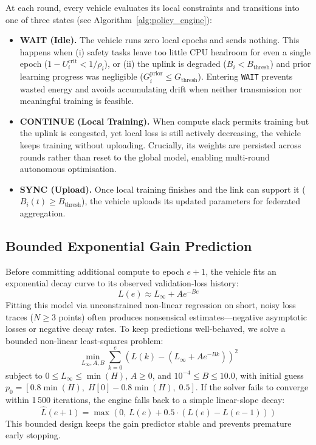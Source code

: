 \documentclass[conference]{IEEEtran}
\begin{document}
At each round, every vehicle evaluates its local constraints and transitions into one of three states (see Algorithm~\ref{alg:policy_engine}):

\begin{itemize}
    \item \textbf{WAIT (Idle).} The vehicle runs zero local epochs and sends nothing. This happens when (i) safety tasks leave too little CPU headroom for even a single epoch ($1 - U_i^{\text{crit}} < 1/\rho_i$), or (ii) the uplink is degraded ($B_i < B_{\text{thresh}}$) and prior learning progress was negligible ($G_i^{\text{prior}} \le G_{\text{thresh}}$). Entering \texttt{WAIT} prevents wasted energy and avoids accumulating drift when neither transmission nor meaningful training is feasible.
    \item \textbf{CONTINUE (Local Training).} When compute slack permits training but the uplink is congested, yet local loss is still actively decreasing, the vehicle keeps training without uploading. Crucially, its weights are persisted across rounds rather than reset to the global model, enabling multi-round autonomous optimisation.
    \item \textbf{SYNC (Upload).} Once local training finishes and the link can support it ($B_i(t) \ge B_{\text{thresh}}$), the vehicle uploads its updated parameters for federated aggregation.
\end{itemize}

\subsection{Bounded Exponential Gain Prediction}
Before committing additional compute to epoch $e{+}1$, the vehicle fits an exponential decay curve to its observed validation-loss history:
\begin{equation}
L(e) \approx L_\infty + A e^{-B e}
\end{equation}
Fitting this model via unconstrained non-linear regression on short, noisy loss traces ($N \ge 3$ points) often produces nonsensical estimates---negative asymptotic losses or negative decay rates. To keep predictions well-behaved, we solve a bounded non-linear least-squares problem:
\begin{equation}
\min_{L_\infty, A, B} \sum_{k=0}^{e} \left( L(k) - (L_\infty + A e^{-B k}) \right)^2
\end{equation}
subject to $0 \le L_\infty \le \min(H)$, $A \ge 0$, and $10^{-4} \le B \le 10.0$, with initial guess $p_0 = [0.8\min(H),\; H[0] - 0.8\min(H),\; 0.5]$. If the solver fails to converge within 1\,500 iterations, the engine falls back to a simple linear-slope decay:
\begin{equation}
\widehat{L}(e+1) = \max\left(0,\, L(e) + 0.5 \cdot (L(e) - L(e-1))\right)
\end{equation}
This bounded design keeps the gain predictor stable and prevents premature early stopping.
\end{document}
